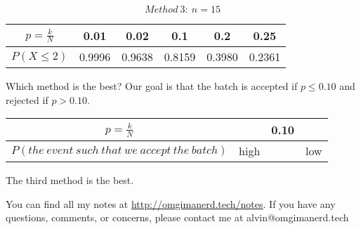 \documentclass[letterpaper, 12pt]{math}
\begin{document}
\[ Method\ 3:\ n = 15 \]
\begin{center}
  \begin{tabular}{|c|c|c|c|c|c|}
    \hline
    \( p = \frac{k}{N} \) & 0.01 & 0.02 & 0.1 & 0.2 & 0.25 \\
    \hline
    \( P(X\leq 2) \) & 0.9996 & 0.9638 & 0.8159 & 0.3980 & 0.2361 \\
    \hline
  \end{tabular}
\end{center}
Which method is the best? Our goal is that the batch is accepted if
\( p \leq 0.10 \) and rejected if \( p > 0.10 \).
\begin{center}
  \begin{tabular}{|c|c|c|c|}
    \hline
    \( p = \frac{k}{N} \) & & 0.10 & \\
    \hline
    \( P(the\ event\ such\ that\ we\ accept\ the\ batch) \) & high & & low \\
    \hline
  \end{tabular}
\end{center}
The third method is the best.

\begin{center}
  You can find all my notes at \url{http://omgimanerd.tech/notes}. If you have
  any questions, comments, or concerns, please contact me at
  alvin@omgimanerd.tech
\end{center}
\end{document}
